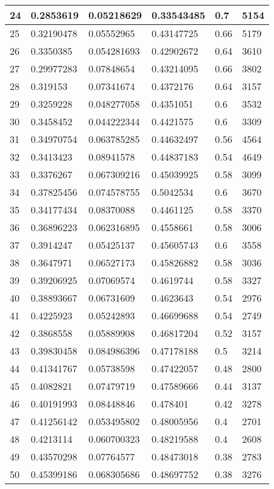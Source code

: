 \begin{longtable}{|l|l|l|l|l|l|}
24 & 0.2853619 & 0.05218629 & 0.33543485 & 0.7 & 5154 \\ \hline 
25 & 0.32190478 & 0.05552965 & 0.43147725 & 0.66 & 5179 \\ \hline 
26 & 0.3350385 & 0.054281693 & 0.42902672 & 0.64 & 3610 \\ \hline 
27 & 0.29977283 & 0.07848654 & 0.43214095 & 0.66 & 3802 \\ \hline 
28 & 0.319153 & 0.07341674 & 0.4372176 & 0.64 & 3157 \\ \hline 
29 & 0.3259228 & 0.048277058 & 0.4351051 & 0.6 & 3532 \\ \hline 
30 & 0.3458452 & 0.044222344 & 0.4421575 & 0.6 & 3309 \\ \hline 
31 & 0.34970754 & 0.063785285 & 0.44632497 & 0.56 & 4564 \\ \hline 
32 & 0.3413423 & 0.08941578 & 0.44837183 & 0.54 & 4649 \\ \hline 
33 & 0.3376267 & 0.067309216 & 0.45039925 & 0.58 & 3099 \\ \hline 
34 & 0.37825456 & 0.074578755 & 0.5042534 & 0.6 & 3670 \\ \hline 
35 & 0.34177434 & 0.08370088 & 0.4461125 & 0.58 & 3370 \\ \hline 
36 & 0.36896223 & 0.062316895 & 0.4558661 & 0.58 & 3006 \\ \hline 
37 & 0.3914247 & 0.05425137 & 0.45605743 & 0.6 & 3558 \\ \hline 
38 & 0.3647971 & 0.06527173 & 0.45826882 & 0.58 & 3036 \\ \hline 
39 & 0.39206925 & 0.07069574 & 0.4619744 & 0.58 & 3327 \\ \hline 
40 & 0.38893667 & 0.06731609 & 0.4623643 & 0.54 & 2976 \\ \hline 
41 & 0.4225923 & 0.05242893 & 0.46699688 & 0.54 & 2749 \\ \hline 
42 & 0.3868558 & 0.05889908 & 0.46817204 & 0.52 & 3157 \\ \hline 
43 & 0.39830458 & 0.084986396 & 0.47178188 & 0.5 & 3214 \\ \hline 
44 & 0.41341767 & 0.05738598 & 0.47422057 & 0.48 & 2800 \\ \hline 
45 & 0.4082821 & 0.07479719 & 0.47589666 & 0.44 & 3137 \\ \hline 
46 & 0.40191993 & 0.08448846 & 0.478401 & 0.42 & 3278 \\ \hline 
47 & 0.41256142 & 0.053495802 & 0.48005956 & 0.4 & 2701 \\ \hline 
48 & 0.4213114 & 0.060700323 & 0.48219588 & 0.4 & 2608 \\ \hline 
49 & 0.43570298 & 0.07764577 & 0.48473018 & 0.38 & 2783 \\ \hline 
50 & 0.45399186 & 0.068305686 & 0.48697752 & 0.38 & 3276 \\ \hline 
\end{longtable}